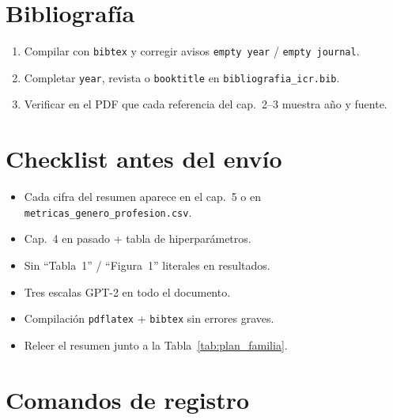 \documentclass[11pt,a4paper]{article}
\newcommand{\archivo}[1]{\texttt{\nolinkurl{#1}}}
\begin{document}
\section{Bibliografía}
\label{sec:bib}

\begin{enumerate}[label=\arabic*., leftmargin=*]
  \item Compilar con \texttt{bibtex} y corregir avisos \texttt{empty year} / \texttt{empty journal}.
  \item Completar \texttt{year}, revista o \texttt{booktitle} en \archivo{bibliografia\_icr.bib}.
  \item Verificar en el PDF que cada referencia del cap.~2--3 muestra año y fuente.
\end{enumerate}

\section{Checklist antes del envío}
\label{sec:qa}

\begin{itemize}[label=$\square$, leftmargin=*]
  \item Cada cifra del resumen aparece en el cap.~5 o en \archivo{metricas\_genero\_profesion.csv}.
  \item Cap.~4 en pasado + tabla de hiperparámetros.
  \item Sin ``Tabla~1'' / ``Figura~1'' literales en resultados.
  \item Tres escalas GPT-2 en todo el documento.
  \item Compilación \texttt{pdflatex} + \texttt{bibtex} sin errores graves.
  \item Releer el resumen junto a la Tabla~\ref{tab:plan_familia}.
\end{itemize}

\section{Comandos de registro}
\end{document}
